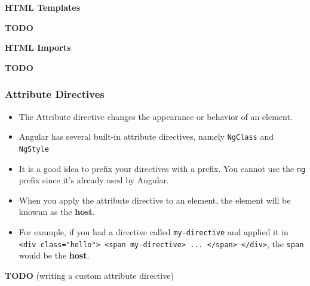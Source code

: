 \documentclass[12pt,]{article}
\providecommand{\tightlist}{%
  \setlength{\itemsep}{0pt}\setlength{\parskip}{0pt}}
\begin{document}
\textbf{HTML Templates}

\textbf{TODO}

\textbf{HTML Imports}

\textbf{TODO}

\subsubsection{Attribute Directives}\label{attribute-directives}

\begin{itemize}
\tightlist
\item
  The Attribute directive changes the appearance or behavior of an
  element.
\item
  Angular has several built-in attribute directives, namely
  \texttt{NgClass} and \texttt{NgStyle}
\item
  It is a good idea to prefix your directives with a prefix. You cannot
  use the \texttt{ng} prefix since it's already used by Angular.
\item
  When you apply the attribute directive to an element, the element will
  be knownn as the \textbf{host}.
\item
  For example, if you had a directive called \texttt{my-directive} and
  applied it in
  \texttt{\textless{}div\ class="hello"\textgreater{}\ \textless{}span\ my-directive\textgreater{}\ ...\ \textless{}/span\textgreater{}\ \textless{}/div\textgreater{}},
  the \texttt{span} would be the \textbf{host}.
\end{itemize}

\textbf{TODO} (writing a custom attribute directive)
\end{document}
